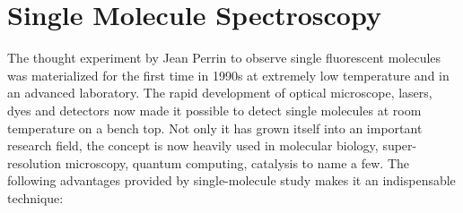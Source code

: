 \documentclass[11pt,a4paper,onecolumn]{article}
\begin{document}
\section{Single Molecule Spectroscopy}
The thought experiment by Jean Perrin to observe single fluorescent molecules was materialized for the first time in 1990s at extremely low temperature and in an advanced laboratory.\cite{orrit1990single}
The rapid development of optical microscope, lasers, dyes and detectors now made it possible to detect single molecules at room temperature on a bench top.\cite{xie1998optical,weiss1999fluorescence,moerner1999illuminating}
Not only it has grown itself into an important research field, the concept is now heavily used in molecular biology, super-resolution microscopy, quantum computing, catalysis to name a few.\cite{zhuang2000a,huang2008threedimensional,eisaman2011invited,lounis2005singlephoton,roeffaers2007singlemolecule}
The following advantages provided by single-molecule study makes it an indispensable technique:
\end{document}
